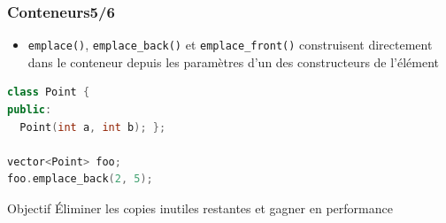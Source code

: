 \documentclass[C++.tex]{subfiles}
\begin{document}
\begin{frame}[fragile]
	\frametitle{Conteneurs\titlehfill{}5/6}
	\begin{itemize}
		\item \lstinline|emplace()|, \lstinline|emplace_back()| et \lstinline|emplace_front()| construisent directement dans le conteneur depuis les paramètres d'un des constructeurs de l'élément
	\end{itemize}

	\begin{lstlisting}[language=C++]
class Point {
public:
  Point(int a, int b); };

vector<Point> foo;
foo.emplace_back(2, 5);\end{lstlisting}

	\begin{block}{Objectif}
		Éliminer les copies inutiles restantes et gagner en performance

	\end{block}
\end{frame}
\end{document}

